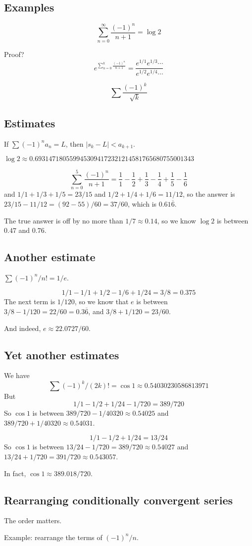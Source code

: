 \documentclass[12pt]{article}
\begin{document}
\subsection{Examples}

$$
\sum_{n=0}^\infty \frac{(-1)^n}{n+1} = \log 2
$$

Proof?
$$
e^{\sum_{n=0}^k \frac{(-1)^n}{n+1}} = \frac{e^{1/1} e^{1/3} \cdots}{e^{1/2} e^{1/4} \cdots}
$$

$$
\sum \frac{(-1)^k}{\sqrt{k}}
$$

\subsection{Estimates}

If $\sum (-1)^n a_n = L$, then $|s_k - L| < a_{k+1}$.

$\log 2 \approx 0.6931471805599453094172321214581765680755001343$

$$
\sum_{n=0}^5 \frac{(-1)^n}{n+1} = \frac{1}{1} - \frac{1}{2} + \frac{1}{3} - \frac{1}{4} + \frac{1}{5} - \frac{1}{6}
$$
and $1/1 + 1/3 + 1/5 = 23/15$ and $1/2 + 1/4 + 1/6 = 11/12$, so the
answer is $23/15 - 11/12 = (92 - 55)/60 = 37/60$, which is $0.61\overline{6}$.

The true answer is off by no more than $1/7 \approx 0.14$, so we know $\log 2$ is between $0.47$ and $0.76$.

\subsection{Another estimate}

$\sum (-1)^n / n! = 1/e$.

$$
1/1 - 1/1 + 1/2 - 1/6 + 1/24 = 3/8 = 0.375
$$
The next term is $1/120$, so we know that $e$ is between $3/8 - 1/120
= 22/60 = 0.3\overline{6}$, and $3/8 + 1/120 = 23/60$.

And indeed, $e \approx 22.0727/60$.

\subsection{Yet another estimates}

We have
$$
\sum (-1)^k / (2k)! = \cos 1 \approx 0.54030230586813971
$$
But
$$
1/1 - 1/2 + 1/24 - 1/720 = 389/720
$$
So $\cos 1$ is between $389/720 - 1/40320 \approx 0.54025$ and $389/720 + 1/40320 \approx 0.54031$.

$$
1/1 - 1/2 + 1/24 = 13/24
$$
So $\cos 1$ is between $13/24 - 1/720 = 389/720 \approx 0.54027$ and $13/24 + 1/720 = 391/720 \approx 0.543057$.

In fact, $\cos 1 \approx 389.018 / 720$.

\subsection{Rearranging conditionally convergent series}

The order matters.

Example: rearrange the terms of $(-1)^n/n$.
\end{document}
